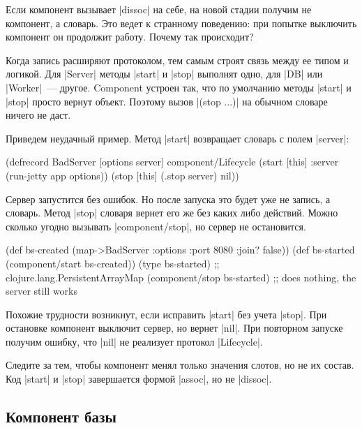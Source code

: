 Если компонент вызывает \spverb|dissoc| на себе, на новой стадии получим не
компонент, а словарь. Это ведет к странному поведению: при попытке выключить
компонент он продолжит работу. Почему так происходит?

Когда запись расширяют протоколом, тем самым строят связь между ее типом и
логикой. Для \spverb|Server| методы \spverb|start| и \spverb|stop| выполнят
одно, для \spverb|DB| или \spverb|Worker|~--- другое. Component устроен так, что
по умолчанию методы \spverb|start| и \spverb|stop| просто вернут объект. Поэтому
вызов \spverb|(stop {...})| на обычном словаре ничего не даст.

Приведем неудачный пример. Метод \spverb|start| возвращает словарь с полем
\spverb|server|:

\begin{english}
  \begin{clojure}
(defrecord BadServer [options server]
  component/Lifecycle
  (start [this]
    {:server (run-jetty app options)})
  (stop [this]
    (.stop server)
    nil))
  \end{clojure}
\end{english}

Сервер запустится без ошибок. Но после запуска это будет уже не запись, а
словарь. Метод \spverb|stop| словаря вернет его же без каких либо
действий. Можно сколько угодно вызывать \spverb|component/stop|, но сервер не
остановится.

\begin{english}
  \begin{clojure}
(def bs-created (map->BadServer {:options {:port 8080 :join? false}}))
(def bs-started (component/start bs-created))
(type bs-started)
;; clojure.lang.PersistentArrayMap
(component/stop bs-started)
;; does nothing, the server still works
  \end{clojure}
\end{english}

Похожие трудности возникнут, если исправить \spverb|start| без учета
\spverb|stop|. При остановке компонент выключит сервер, но вернет
\spverb|nil|. При повторном запуске получим ошибку, что \spverb|nil| не
реализует протокол \spverb|Lifecycle|.

Следите за тем, чтобы компонент менял только значения слотов, но не их
состав. Код \spverb|start| и \spverb|stop| завершается формой \spverb|assoc|, но
не \spverb|dissoc|.

\subsection{Компонент базы}

